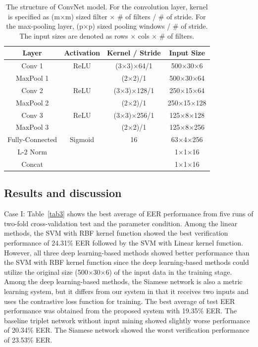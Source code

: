 \documentclass[runningheads]{llncs}
\begin{document}
 \begin{table}[]
    \caption{
        The structure of ConvNet model. For the convolution layer, kernel is specified as (m$\times$m) sized filter $\times$ \# of filters / \# of stride. For the max-pooling layer, (p$\times$p) sized pooling windows / \# of stride. The input sizes are denoted as rows $\times$ cols $\times$ \# of filters. 
    }\label{tab1}
    \centering
    \begin{tabular}{|c|c|c|c|}
    \hline
    Layer     & Activation & Kernel / Stride & Input Size \\ \hline
    Conv 1    & ReLU       & (3$\times$3)$\times$64/1      & 500$\times$30$\times$6   \\
    MaxPool 1 &            & (2$\times$2)/1         & 500$\times$30$\times$64  \\
    Conv 2    & ReLU       & (3$\times$3)$\times$128/1     & 250$\times$15$\times$64 \\
    MaxPool 2 &            & (2$\times$2)/1         & 250$\times$15$\times$128 \\
    Conv 3    & ReLU       & (3$\times$3)$\times$256/1     & 125$\times$8$\times$128  \\
    MaxPool 3 &            & (2$\times$2)/1         & 125$\times$8$\times$256  \\
    Fully-Connected     & Sigmoid    & 16             & 63$\times$4$\times$256   \\
    L-2 Norm  &            &                 & 1$\times$1$\times$16    \\
    Concat    &            &                 & 1$\times$1$\times$16    \\ \hline
    \end{tabular}
\end{table}

\subsection{Results and discussion}

Case I: Table~\ref{tab3} shows the best average of EER performance from five runs of two-fold cross-validation test and the parameter condition. Among the linear methods, the SVM with RBF kernel function showed the best verification performance of 24.31\% EER followed by the SVM with Linear kernel function. However, all three deep learning-based methods showed better performance than the SVM with RBF kernel function since the deep learning-based methods could utilize the original size (500$\times$30$\times$6) of the input data in the training stage.
Among the deep learning-based methods, the Siamese network is also a metric learning system, but it differs from our system in that it receives two inputs and uses the contrastive loss function for training. 
The best average of test EER performance was obtained from the proposed system with 19.35\% EER. The baseline triplet network without input mining showed slightly worse performance of 20.34\% EER. The Siamese network showed the worst verification performance of 23.53\% EER.
\end{document}
